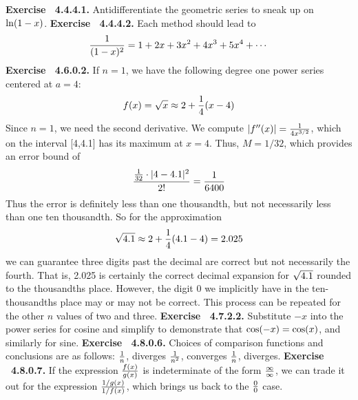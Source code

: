  {\noindent \protect \bf  Exercise ~4.4.4.1.} Antidifferentiate the geometric series to sneak up on $\protect \qopname  \relax o{ln}(1-x)$. \protect \newline  \protect \newline  
 {\noindent \protect \bf  Exercise ~4.4.4.2.} Each method should lead to $$\protect \frac  {1}{(1-x)^2}=1+2x+3x^2+4x^3+5x^4+\protect \cdots  $$ \protect \newline  \protect \newline  
 {\noindent \protect \bf  Exercise ~4.6.0.2.} If $n=1$, we have the following degree one power series centered at $a=4$: $$f(x)=\protect \sqrt  {x}\approx 2+\protect \frac  {1}{4}(x-4)$$ Since $n=1$, we need the second derivative. We compute $\left |f''(x)\right |=\protect \frac  {1}{4x^{3/2}}$, which on the interval [4,4.1] has its maximum at $x=4$. Thus, $M=1/32$, which provides an error bound of $$\protect \frac  {\protect \frac  {1}{32}\cdot |4-4.1|^2}{2!}=\protect \frac  {1}{6400}$$ Thus the error is definitely less than one thousandth, but not necessarily less than one ten thousandth. So for the approximation $$\protect \sqrt  {4.1}\approx 2+\protect \frac  {1}{4}(4.1-4)=2.025$$ we can guarantee three digits past the decimal are correct but not necessarily the fourth. That is, 2.025 is certainly the correct decimal expansion for $\protect \sqrt  {4.1}$ rounded to the thousandths place. However, the digit 0 we implicitly have in the ten-thousandths place may or may not be correct. This process can be repeated for the other $n$ values of two and three. \protect \newline  \protect \newline  
 {\noindent \protect \bf  Exercise ~4.7.2.2.} Substitute $-x$ into the power series for cosine and simplify to demonstrate that $\protect \qopname  \relax o{cos}(-x)=\protect \qopname  \relax o{cos}(x)$, and similarly for sine. \protect \newline  \protect \newline  
 {\noindent \protect \bf  Exercise ~4.8.0.6.} Choices of comparison functions and conclusions are as follows: \textbullet $\protect \frac  {1}{n}$, diverges \textbullet $\protect \frac  {1}{n^2}$, converges \textbullet $\protect \frac  {1}{n}$, diverges.  \protect \newline  \protect \newline  
 {\noindent \protect \bf  Exercise ~4.8.0.7.} If the expression $\protect \frac  {f(x)}{g(x)}$ is indeterminate of the form $\protect \frac  {\infty }{\infty }$, we can trade it out for the expression $\protect \frac  {1/g(x)}{1/f(x)}$, which brings us back to the $\protect \frac  {0}{0}$ case. \protect \newline  \protect \newline  
